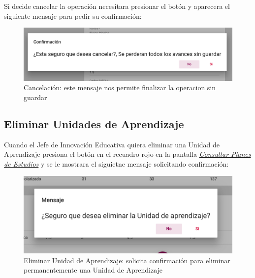 Si decide cancelar la operación necesitara presionar el botón  y aparecera el siguiente mensaje para pedir su confirmación:\\
\begin{figure}[!hbtp]
    \centering
    \hypertarget{cancelarE}{\includegraphics[width=0.7\linewidth]{images/GUA/cancelar}}
    \caption{Cancelación: este mensaje nos permite finalizar la operacion sin guardar}
    \label{cancelarE}
\end{figure}
\newpage
\subsection{Eliminar Unidades de Aprendizaje}
Cuando el Jefe de Innovación Educativa quiera eliminar una Unidad de Aprendizaje presiona el botón  en el recuadro rojo en la pantalla \hyperlink{consultarUA}{\textit{Consultar Planes de Estudios}} y se le mostrara el siguietne mensaje solicitando confirmación:\\
\begin{figure}[!hbtp]
    \centering
    \hypertarget{EliminarUA}{\includegraphics[width=0.7\linewidth]{images/GUA/EliminarUA}}
    \caption{Eliminar Unidad de Aprendizaje: solicita confirmación para eliminar permanentemente una Unidad de Aprendizaje}
    \label{EliminarUA}
\end{figure}